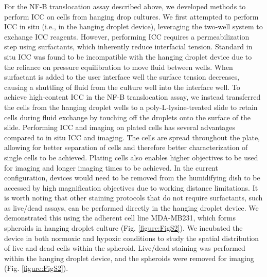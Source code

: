 For the NF-\textkappa B translocation assay described above, we developed methods to perform ICC on cells from hanging drop cultures. We first attempted to perform ICC in situ (i.e., in the hanging droplet device), leveraging the two-well system to exchange ICC reagents. However, performing ICC requires a permeabilization step using surfactants, which inherently reduce interfacial tension. Standard in situ ICC was found to be incompatible with the hanging droplet device due to the reliance on pressure equilibration to move fluid between wells. When surfactant is added to the user interface well  the surface tension decreases, causing a shuttling of fluid from the culture well into the interface well. To achieve high-content ICC in the NF-\textkappa B translocation assay, we instead transferred the cells from the hanging droplet wells to a poly-L-lysine-treated slide to retain cells during fluid exchange by touching off the droplets onto the surface of the slide.  Performing ICC and imaging on plated cells has several advantages compared to in situ ICC and imaging. The cells are spread throughout the plate, allowing for better separation of cells and therefore better characterization of single cells to be achieved. Plating cells also enables higher objectives to be used for imaging and longer imaging times to be achieved. In the current configuration, devices would need to be removed from the humidifying dish to be accessed by high magnification objectives due to working distance limitations. 
It is worth noting that other staining protocols that do not require surfactants, such as live/dead assays, can be performed directly in the hanging droplet device. We demonstrated this using the adherent cell line MDA-MB231, which forms spheroids in hanging droplet culture (Fig. \ref{figure:FigS2}). We incubated the device in both normoxic and hypoxic conditions to study the spatial distribution of live and dead cells within the spheroid. Live/dead staining was performed within the hanging droplet device, and the spheroids were removed for imaging (Fig. \ref{figure:FigS2}). 
\newline
